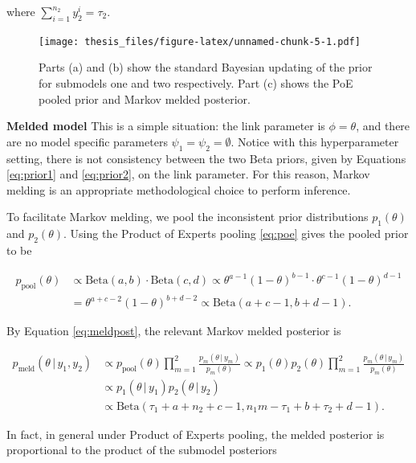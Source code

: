 \documentclass[11pt,]{book}
\begin{document}
where \(\sum_{i=1}^{n_2} y_2^i = \tau_2\).

\begin{figure}
\centering
\texttt{[image: thesis\_files/figure-latex/unnamed-chunk-5-1.pdf]}
\caption{\label{fig:unnamed-chunk-5}Parts (a) and (b) show the standard
Bayesian updating of the prior for submodels one and two respectively.
Part (c) shows the PoE pooled prior and Markov melded posterior.
\label{fig:ex1}}
\end{figure}

\textbf{Melded model} This is a simple situation: the link parameter is
\(\phi = \theta\), and there are no model specific parameters
\(\psi_1 = \psi_2 = \emptyset\). Notice with this hyperparameter
setting, there is not consistency between the two Beta priors, given by
Equations \eqref{eq:prior1} and \eqref{eq:prior2}, on the link
parameter. For this reason, Markov melding is an appropriate
methodological choice to perform inference.

To facilitate Markov melding, we pool the inconsistent prior
distributions \(p_1(\theta)\) and \(p_2(\theta)\). Using the Product of
Experts pooling \eqref{eq:poe} gives the pooled prior to be

\begin{align}
p_\text{pool}(\theta) &\propto \text{Beta}(a, b) \cdot \text{Beta}(c, d) 
                      \propto \theta^{a-1}(1 - \theta)^{b-1} \cdot \theta^{c-1}(1 - \theta)^{d-1} \nonumber \\
                      &= \theta^{a + c - 2}(1 - \theta)^{b + d - 2} \propto \text{Beta}(a + c - 1, b + d - 1). \label{eq:pooledbeta}
\end{align}

By Equation \eqref{eq:meldpost}, the relevant Markov melded posterior is

\begin{align}
p_{\text{meld}}(\theta \, | \, y_1, y_2)
&\propto p_{\text{pool}}(\theta) \prod_{m=1}^{2} \frac{p_m(\theta \, | \, y_m)}{p_m(\theta)}
\propto p_1(\theta)p_2(\theta) \prod_{m=1}^{2} \frac{p_m(\theta \, | \, y_m)}{p_m(\theta)} \nonumber \\
&\propto p_1(\theta \, | \, y_1)p_2(\theta \, | \, y_2) \nonumber \\
&\propto \text{Beta}(\tau_1 + a + n_2 + c - 1, n_1m-\tau_1 + b + \tau_2 + d - 1). \label{eq:meldedbeta}
\end{align}

In fact, in general under Product of Experts pooling, the melded
posterior is proportional to the product of the submodel posteriors
\end{document}
